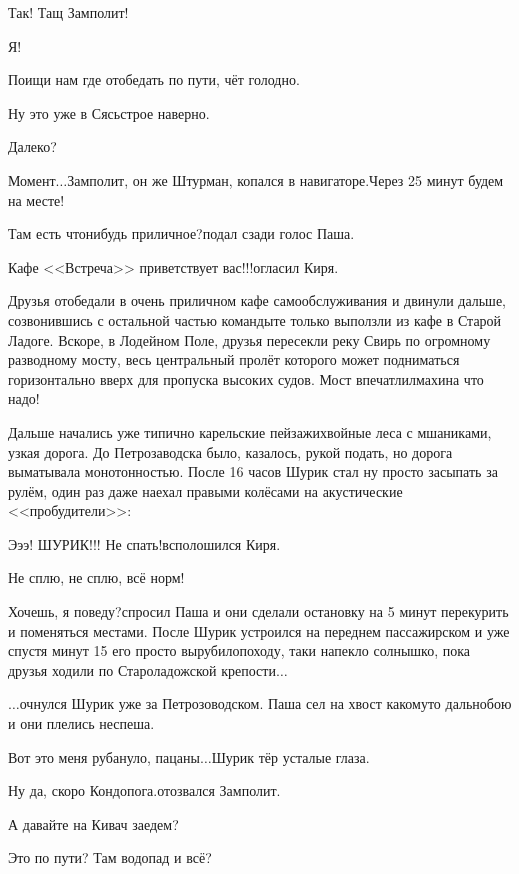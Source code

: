 \diagdash Так! Тащ Замполит!

\diagdash Я!

\diagdash Поищи нам где отобедать по пути, чёт голодно.

\diagdash Ну это уже в Сясьстрое наверно.

\diagdash Далеко?

\diagdash Момент$\ldots$\mdash Замполит, он же Штурман, копался в навигаторе.\mdash Через 25 минут будем на месте!

\diagdash Там есть что\sdash нибудь приличное?\mdash подал сзади голос Паша.

\diagdash Кафе <<Встреча>> приветствует вас!!!\mdash огласил Киря.

Друзья отобедали в очень приличном кафе самообслуживания и двинули дальше, созвонившись с остальной частью команды\mdash те только выползли из кафе в Старой Ладоге. Вскоре, в Лодейном Поле, друзья пересекли реку Свирь по огромному разводному мосту, весь центральный пролёт которого может подниматься горизонтально вверх для пропуска высоких судов. Мост впечатлил\mdash махина что надо!

Дальше начались уже типично карельские пейзажи\mdash хвойные леса с мшаниками, узкая дорога. До Петрозаводска было, казалось, рукой подать, но дорога выматывала монотонностью. После 16 часов Шурик стал ну просто засыпать за рулём, один раз даже наехал правыми колёсами на акустические <<пробудители>>:

\diagdash Э\sdash э\sdash э! ШУРИК!!! Не спать!\mdash всполошился Киря.

\diagdash Не сплю, не сплю, всё норм!

\diagdash Хочешь, я поведу?\mdash спросил Паша и они сделали остановку на 5 минут перекурить и поменяться местами. После Шурик устроился на переднем пассажирском и уже спустя минут 15 его просто вырубило\mdash походу, таки напекло солнышко, пока друзья ходили по Староладожской крепости$\ldots$

\vspace{0.5cm}

$\ldots$очнулся Шурик уже за Петрозоводском. Паша сел на хвост какому\sdash то дальнобою и они плелись неспеша. 

\diagdash Вот это меня рубануло, пацаны$\ldots$\mdash Шурик тёр усталые глаза.

\diagdash Ну да, скоро Кондопога.\mdash отозвался Замполит.

\diagdash А давайте на Кивач заедем?

\diagdash Это по пути? Там водопад и всё?

